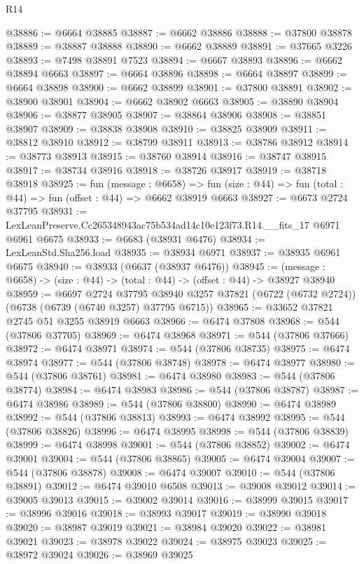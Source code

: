 \begin{lexlean}{R14}
\begin{coremodule}
@38886 := @6664 @38885
@38887 := @6662 @38886
@38888 := @37800 @38878
@38889 := @38887 @38888
@38890 := @6662 @38889
@38891 := @37665 @3226
@38893 := @7498 @38891 @7523
@38894 := @6667 @38893
@38896 := @6662 @38894 @6663
@38897 := @6664 @38896
@38898 := @6664 @38897
@38899 := @6664 @38898
@38900 := @6662 @38899
@38901 := @37800 @38891
@38902 := @38900 @38901
@38904 := @6662 @38902 @6663
@38905 := @38890 @38904
@38906 := @38877 @38905
@38907 := @38864 @38906
@38908 := @38851 @38907
@38909 := @38838 @38908
@38910 := @38825 @38909
@38911 := @38812 @38910
@38912 := @38799 @38911
@38913 := @38786 @38912
@38914 := @38773 @38913
@38915 := @38760 @38914
@38916 := @38747 @38915
@38917 := @38734 @38916
@38918 := @38726 @38917
@38919 := @38718 @38918
@38925 := fun (message : @6658) =>
  fun (size : @44) => fun (total : @44) => fun (offset : @44) => @6662 @38919 @6663
@38927 := @6673 @2724 @37795
@38931 := LexLeanPreserve.Cc265348943ac75b534ad14c10e123f73.R14.__fits_17 @6971 @6961 @6675
@38933 := @6683 (@38931 @6476)
@38934 := LexLeanStd.Sha256.load
@38935 := @38934 @6971
@38937 := @38935 @6961 @6675
@38940 := @38933 (@6637 (@38937 @6476))
@38945 := (message : @6658) -> (size : @44) -> (total : @44) -> (offset : @44) -> @38927 @38940
@38959 := @6697
    @2724
    @37795
    @38940
    @3257
    @37821
    (@6722 (@6732 @2724))
    (@6738 (@6739 (@6740 @3257) @37795 @6715))
@38965 := @33652 @37821 @2745 @51 @3255 @38919 @6663
@38966 := @6474 @37808
@38968 := @544 (@37806 @37705)
@38969 := @6474 @38968
@38971 := @544 (@37806 @37666)
@38972 := @6474 @38971
@38974 := @544 (@37806 @38735)
@38975 := @6474 @38974
@38977 := @544 (@37806 @38748)
@38978 := @6474 @38977
@38980 := @544 (@37806 @38761)
@38981 := @6474 @38980
@38983 := @544 (@37806 @38774)
@38984 := @6474 @38983
@38986 := @544 (@37806 @38787)
@38987 := @6474 @38986
@38989 := @544 (@37806 @38800)
@38990 := @6474 @38989
@38992 := @544 (@37806 @38813)
@38993 := @6474 @38992
@38995 := @544 (@37806 @38826)
@38996 := @6474 @38995
@38998 := @544 (@37806 @38839)
@38999 := @6474 @38998
@39001 := @544 (@37806 @38852)
@39002 := @6474 @39001
@39004 := @544 (@37806 @38865)
@39005 := @6474 @39004
@39007 := @544 (@37806 @38878)
@39008 := @6474 @39007
@39010 := @544 (@37806 @38891)
@39012 := @6474 @39010 @6508
@39013 := @39008 @39012
@39014 := @39005 @39013
@39015 := @39002 @39014
@39016 := @38999 @39015
@39017 := @38996 @39016
@39018 := @38993 @39017
@39019 := @38990 @39018
@39020 := @38987 @39019
@39021 := @38984 @39020
@39022 := @38981 @39021
@39023 := @38978 @39022
@39024 := @38975 @39023
@39025 := @38972 @39024
@39026 := @38969 @39025

\end{coremodule}
\end{lexlean}
